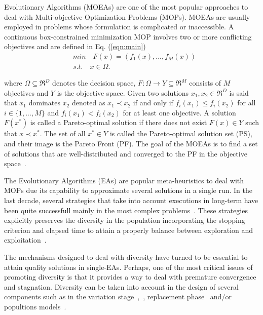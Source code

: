  Evolutionary Algorithms (MOEAs) are one of the most popular approaches to deal with Multi-objective Optimization Problems (MOPs).
%
MOEAs are usually employed in problems whose formulation is complicated or inaccessible.
%
A continuous box-constrained minimization MOP involves two or more conflicting objectives and are defined in Eq. (\ref{eqn:main})
\begin{equation}\label{eqn:main}
\begin{split}
&min \quad F(x) = (f_1(x), ..., f_M(x)) \\
&s.t. \quad x \in \Omega.
\end{split}
\end{equation}

where $\Omega \subseteq \Re^D$ denotes the decision space, $F: \Omega \rightarrow Y \subseteq \Re^M$ consists of $M$ objectives and $Y$ is the objective space.
%
Given two solutions $x_1, x_2 \in \Re^D$ is said that $x_1$ dominates $x_2$ denoted as $x_1 \prec x_2$ if and only if $f_i(x_1) \leq f_i(x_2)$ for all $i \in \{1,...,M\}$ and $f_i(x_1) < f_i(x_2)$ for at least one objective.
%
%
A solution $F(x^*)$ is called a Pareto-optimal solution if there does not exist $F(x) \in Y$ such that $x \prec x^*$.
%
The set of all $x^* \in Y$ is called the Pareto-optimal solution set (PS), and their image is the Pareto Front (PF).
%
The goal of the MOEAs is to find a set of solutions that are well-distributed and converged to the PF in the objective space~\cite{trivedi2016survey}.
%

The Evolutionary Algorithms (EAs) are popular meta-heuristics to deal with MOPs due its capability to approximate several solutions in a single run.
%
In the last decade, several strategies that take into account executions in long-term have been quite successfull mainly in the most complex problems~\cite{segura2016improving}.
%
These strategies explicitly preserves the diversity in the population incorporating the stopping criterion and elapsed time to attain a properly balance between exploration and exploitation~\cite{segura2015novel}.
%

The mechanisms designed to deal with diversity have turned to be essential to attain quality solutions in single-EAs.
%
Perhaps, one of the most critical issues of promoting diversity is that it provides a way to deal with premature convergence and stagnation.
%
Diversity can be taken into account in the design of several components such as in the variation stage~\cite{herrera2003fuzzy},~\cite{mitchell1998introduction}, replacement phase~\cite{segura2015novel} and/or popultions models~\cite{koumousis2006saw}.
%

